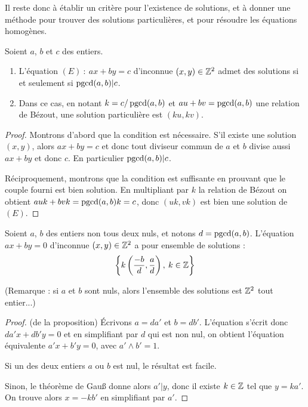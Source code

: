 Il reste donc à établir un critère pour l'existence de solutions, et à donner une méthode pour trouver des solutions particulières, et pour résoudre les équations homogènes.

\begin{proposition}
Soient $a$, $b$ et $c$ des entiers.
\begin{enumerate}
\item L'équation $(E)\: : \: ax+by=c$ d'inconnue $(x,y)\in \mathbb{Z}^2$ admet des solutions si et seulement si $\operatorname{pgcd}(a,b)|c$.
\item Dans ce cas, en notant $k=c/\operatorname{pgcd}(a,b)$ et $au+bv=\operatorname{pgcd}(a,b)$ une relation de Bézout, une solution particulière est $(ku,kv)$.
\end{enumerate}
\end{proposition}
\begin{proof}
Montrons d'abord que la condition est nécessaire. S'il existe une solution $(x,y)$, alors $ax+by=c$ et donc tout diviseur commun de $a$ et $b$ divise aussi $ax+by$ et donc $c$. En  particulier $\operatorname{pgcd}(a,b) | c$.

Réciproquement, montrons que la condition est suffisante en prouvant que le couple fourni est bien solution. En multipliant par $k$ la relation de Bézout on obtient $auk+bvk=\operatorname{pgcd}(a,b) k=c$, donc $(uk,vk)$ est bien une solution de $(E)$.
\end{proof}


\begin{proposition}
Soient $a$, $b$ des entiers non tous deux  nuls, et notons $d = \operatorname{pgcd}(a,b)$. L'équation $ax+by=0$ d'inconnue $(x,y)\in \mathbb{Z}^2$ a pour ensemble de solutions :
\[
\left\{k\left(\frac{-b}{d} , \frac{a}{d}\right),\: k\in \mathbb{Z}\right\}
\]
\end{proposition}

(Remarque : si $a$ et $b$ sont nuls, alors l'ensemble des solutions est $\mathbb{Z}^2$ tout entier...)

\begin{proof}(de la proposition)
\'Ecrivons $a=da'$ et $b=db'$. L'équation s'écrit donc $da'x+db'y=0$ et en simplifiant par $d$ qui est non nul, on obtient l'équation équivalente $a'x+b'y=0$, avec $a'\wedge b'=1$.

Si un des deux entiers $a$ ou $b$ est nul, le résultat est facile.

Sinon, le théorème de Gau{\ss} donne alors $a'|y$, donc il existe $k\in \mathbb{Z}$ tel que $y = ka'$.  On trouve alors $x=-kb'$ en simplifiant par $a'$.
\end{proof}

